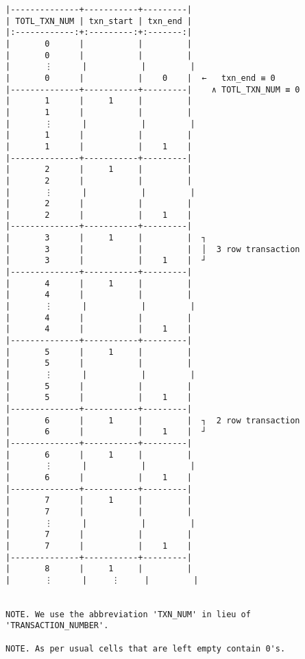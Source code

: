 \documentclass[varwidth=\maxdimen,margin=0.5cm,multi={verbatim}]{standalone}
\begin{document}
\begin{verbatim}
|--------------+-----------+---------|
| TOTL_TXN_NUM | txn_start | txn_end |
|:------------:+:---------:+:-------:|
|       0      |           |         |
|       0      |           |         |
|       ⋮      |           |         |
|       0      |           |    0    |  ←   txn_end ≡ 0
|--------------+-----------+---------|    ∧ TOTL_TXN_NUM ≡ 0
|       1      |     1     |         |
|       1      |           |         |
|       ⋮      |           |         |
|       1      |           |         |
|       1      |           |    1    |
|--------------+-----------+---------|
|       2      |     1     |         |
|       2      |           |         |
|       ⋮      |           |         |
|       2      |           |         |
|       2      |           |    1    |
|--------------+-----------+---------|
|       3      |     1     |         |  ┐
|       3      |           |         |  │  3 row transaction
|       3      |           |    1    |  ┘
|--------------+-----------+---------|
|       4      |     1     |         |
|       4      |           |         |
|       ⋮      |           |         |
|       4      |           |         |
|       4      |           |    1    |
|--------------+-----------+---------|
|       5      |     1     |         |
|       5      |           |         |
|       ⋮      |           |         |
|       5      |           |         |
|       5      |           |    1    |
|--------------+-----------+---------|
|       6      |     1     |         |  ┐  2 row transaction
|       6      |           |    1    |  ┘
|--------------+-----------+---------|
|       6      |     1     |         |
|       ⋮      |           |         |
|       6      |           |    1    |
|--------------+-----------+---------|
|       7      |     1     |         |
|       7      |           |         |
|       ⋮      |           |         |
|       7      |           |         |
|       7      |           |    1    |
|--------------+-----------+---------|
|       8      |     1     |         |
|       ⋮      |     ⋮     |         |


NOTE. We use the abbreviation 'TXN_NUM' in lieu of 'TRANSACTION_NUMBER'.

NOTE. As per usual cells that are left empty contain 0's.

\end{verbatim}
\end{document}
